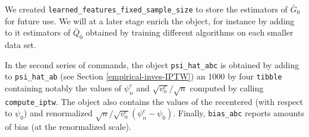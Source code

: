 \documentclass[11pt,openright,twoside]{book}
\newcommand{\Gbar}{\bar{G}}
\newcommand{\Qbar}{\bar{Q}}
\theoremstyle{definition}
\theoremstyle{definition}
\theoremstyle{definition}
\theoremstyle{remark}
\begin{document}
We created \texttt{learned\_features\_fixed\_sample\_size} to store the estimators of
\(\Gbar_{0}\) for future use. We will at a later stage enrich the object, for
instance by adding to it estimators of \(\Qbar_{0}\) obtained by training
different algorithms on each smaller data set.

In the second series of commands, the object \texttt{psi\_hat\_abc} is obtained by
adding to \texttt{psi\_hat\_ab} (see Section \ref{empirical-inves-IPTW}) an 1000
by four \texttt{tibble} containing notably the values of \(\psi_{n}^{c}\) and
\(\sqrt{v_{n}^{c}}/\sqrt{n}\) computed by calling \texttt{compute\_iptw}. The object
also contains the values of the recentered (with respect to \(\psi_{0}\)) and
renormalized \(\sqrt{n}/\sqrt{v_{n}^{c}} (\psi_{n}^{c} - \psi_{0})\). Finally,
\texttt{bias\_abc} reports amounts of bias (at the renormalized scale).
\end{document}

